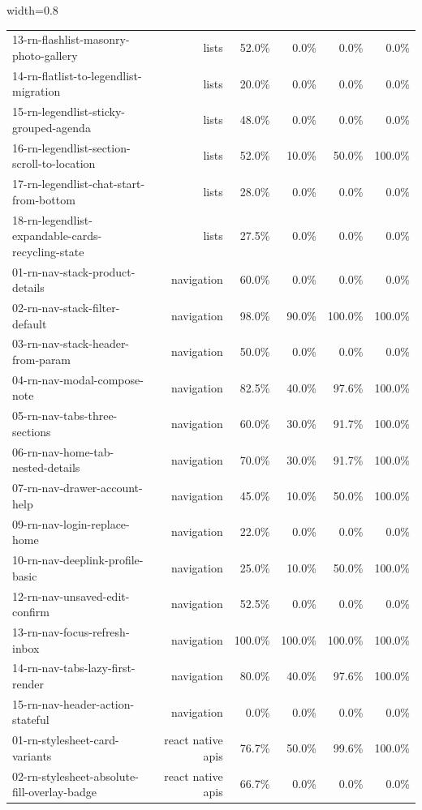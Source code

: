 \begin{table}[htbp]
\begin{adjustbox}{width=0.8\textwidth}
\begin{tabular}{lrrrrr}
13-rn-flashlist-masonry-photo-gallery & lists & 52.0\% & 0.0\% & 0.0\% & 0.0\% \\
14-rn-flatlist-to-legendlist-migration & lists & 20.0\% & 0.0\% & 0.0\% & 0.0\% \\
15-rn-legendlist-sticky-grouped-agenda & lists & 48.0\% & 0.0\% & 0.0\% & 0.0\% \\
16-rn-legendlist-section-scroll-to-location & lists & 52.0\% & 10.0\% & 50.0\% & 100.0\% \\
17-rn-legendlist-chat-start-from-bottom & lists & 28.0\% & 0.0\% & 0.0\% & 0.0\% \\
18-rn-legendlist-expandable-cards-recycling-state & lists & 27.5\% & 0.0\% & 0.0\% & 0.0\% \\
01-rn-nav-stack-product-details & navigation & 60.0\% & 0.0\% & 0.0\% & 0.0\% \\
02-rn-nav-stack-filter-default & navigation & 98.0\% & 90.0\% & 100.0\% & 100.0\% \\
03-rn-nav-stack-header-from-param & navigation & 50.0\% & 0.0\% & 0.0\% & 0.0\% \\
04-rn-nav-modal-compose-note & navigation & 82.5\% & 40.0\% & 97.6\% & 100.0\% \\
05-rn-nav-tabs-three-sections & navigation & 60.0\% & 30.0\% & 91.7\% & 100.0\% \\
06-rn-nav-home-tab-nested-details & navigation & 70.0\% & 30.0\% & 91.7\% & 100.0\% \\
07-rn-nav-drawer-account-help & navigation & 45.0\% & 10.0\% & 50.0\% & 100.0\% \\
09-rn-nav-login-replace-home & navigation & 22.0\% & 0.0\% & 0.0\% & 0.0\% \\
10-rn-nav-deeplink-profile-basic & navigation & 25.0\% & 10.0\% & 50.0\% & 100.0\% \\
12-rn-nav-unsaved-edit-confirm & navigation & 52.5\% & 0.0\% & 0.0\% & 0.0\% \\
13-rn-nav-focus-refresh-inbox & navigation & 100.0\% & 100.0\% & 100.0\% & 100.0\% \\
14-rn-nav-tabs-lazy-first-render & navigation & 80.0\% & 40.0\% & 97.6\% & 100.0\% \\
15-rn-nav-header-action-stateful & navigation & 0.0\% & 0.0\% & 0.0\% & 0.0\% \\
01-rn-stylesheet-card-variants & react native apis & 76.7\% & 50.0\% & 99.6\% & 100.0\% \\
02-rn-stylesheet-absolute-fill-overlay-badge & react native apis & 66.7\% & 0.0\% & 0.0\% & 0.0\% \\

\end{tabular}
\end{adjustbox}
\end{table}
